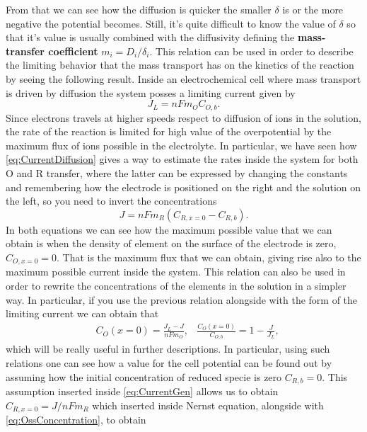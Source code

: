 From that we can see how the diffusion is quicker the smaller $\delta$ is or the more negative the potential becomes. Still, it's quite difficult to know the value of $\delta$ so that it's value is usually combined with the diffusivity defining the \textbf{mass-transfer coefficient} $m_i = D_i/\delta_i$. This relation can be used in order to describe the limiting behavior that the mass transport has on the kinetics of the reaction by seeing the following result.
{
    Inside an electrochemical cell where mass transport is driven by diffusion the system posses a limiting current given by
    \begin{equation}
        \label{eq:LimitingCurrent}
        J_L = nFm_O C_{O,b}.
    \end{equation}
}
{
    Since electrons travels at higher speeds respect to diffusion of ions in the solution, the rate of the reaction is limited for high value of the overpotential by the maximum flux of ions possible in the electrolyte. In particular, we have seen how \eqref{eq:CurrentDiffusion} gives a way to estimate the rates inside the system for both O and R transfer, where the latter can be expressed by changing the constants and remembering how the electrode is positioned on the right and the solution on the left, so you need to invert the concentrations
    \begin{equation}
        \label{eq:CurrentGen}
        J = nFm_R (C_{R, x=0} - C_{R,b}).
    \end{equation} 
    In both equations we can see how the maximum possible value that we can obtain is when the density of element on the surface of the electrode is zero, $C_{O, x=0} = 0$. That is the maximum flux that we can obtain, giving rise also to the maximum possible current inside the system.
}
\noindent
This relation can also be used in order to rewrite the concentrations of the elements in the solution in a simpler way. In particular, if you use the previous relation alongside with the form of the limiting current we can obtain that
\begin{align}
    \label{eq:OssConcentration}
    &C_{O}(x=0) = \frac{J_L - J}{nFm_O}, &\frac{C_{O}(x=0)}{C_{O, b}} = 1 - \frac{J}{J_L},
\end{align}
which will be really useful in further descriptions. In particular, using such relations one can see how a value for the cell potential can be found out by assuming how the initial concentration of reduced specie is zero $C_{R,b} = 0$. This assumption inserted inside \eqref{eq:CurrentGen} allows us to obtain $C_{R, x=0} = J/nFm_R$ which inserted inside Nernst equation, alongside with \eqref{eq:OssConcentration}, to obtain
